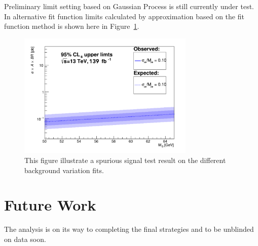 Preliminary limit setting based on Gaussian Process is still currently under test. In alternative fit function limits calculated by approximation based on the fit function method is shown here in Figure~\ref{fig:limits}.

\begin{figure}[!htb]
   \begin{center}
       \includegraphics[width=0.75\textwidth]{figures/chapter_dimuon/limits}
       \caption{
       This figure illustrate a spurious signal test result on the different background variation fits.}
        \label{fig:limits}
   \end{center}
\end{figure}
\FloatBarrier

\section{Future Work}
The analysis is on its way to completing the final strategies and to be unblinded on data soon.




